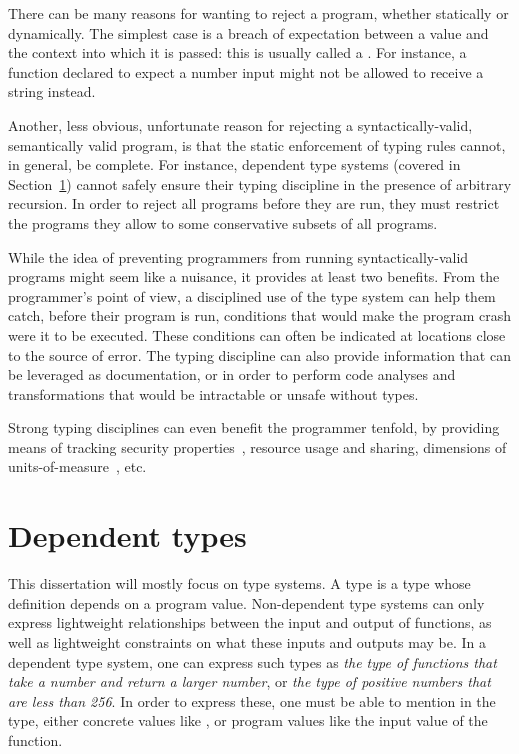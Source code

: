 There can be many reasons for wanting to reject a program, whether statically or
dynamically.  The simplest case is a breach of expectation between a value and
the context into which it is passed: this is usually called a .  For instance, a function declared to expect a number input might not be
allowed to receive a string instead.

Another, less obvious, unfortunate reason for rejecting a syntactically-valid,
semantically valid program, is that the static enforcement of typing rules
cannot, in general, be complete.  For instance, dependent type systems (covered
in Section~\ref{dependent-types}) cannot safely ensure their typing discipline
in the presence of arbitrary recursion.  In order to reject all 
programs before they are run, they must restrict the programs they allow to some
conservative subsets of all  programs.

While the idea of preventing programmers from running syntactically-valid
programs might seem like a nuisance, it provides at least two benefits.  From
the programmer's point of view, a disciplined use of the type system can help
them catch, before their program is run, conditions that would make the program
crash were it to be executed.  These conditions can often be indicated at
locations close to the source of error.  The typing discipline can also provide
information that can be leveraged as documentation, or in order to perform code
analyses and transformations that would be intractable or unsafe without types.

Strong typing disciplines can even benefit the programmer tenfold, by providing
means of tracking security properties~, resource usage
and sharing, dimensions of
units-of-measure~, etc.

\section{Dependent types}\label{dependent-types}

This dissertation will mostly focus on  type systems.  A
 type is a type whose definition depends on a program value.
Non-dependent type systems can only express lightweight relationships between
the input and output of functions, as well as lightweight constraints on what
these inputs and outputs may be.  In a dependent type system, one can express
such types as \textit{the type of functions that take a number and return a
larger number}, or \textit{the type of positive numbers that are less than 256}.
In order to express these, one must be able to mention in the type, either
concrete values like , or program values like the input value of
the function.

